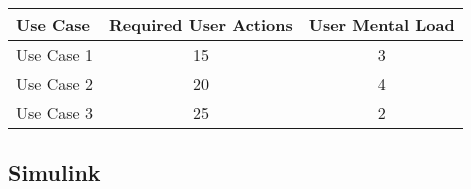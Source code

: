 

\begin{tabular*}{\textwidth}{lcc}
\textbf{Use Case} & \textbf{Required User Actions} & \textbf{User Mental Load}\\
\hline
Use Case 1                          & 15 & 3 \\
Use Case 2                          & 20 & 4 \\
Use Case 3                          & 25 & 2
\end{tabular*}

\subsection{Simulink}




